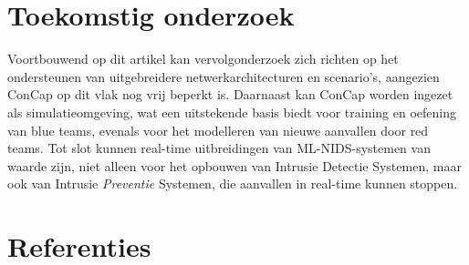 \documentclass[conference]{IEEEtran}
\begin{document}
	\section{Toekomstig onderzoek}
	Voortbouwend op dit artikel kan vervolgonderzoek zich richten op het ondersteunen van uitgebreidere netwerkarchitecturen en scenario’s, aangezien ConCap op dit vlak nog vrij beperkt is. Daarnaast kan ConCap worden ingezet als simulatieomgeving, wat een uitstekende basis biedt voor training en oefening van blue teams, evenals voor het modelleren van nieuwe aanvallen door red teams. Tot slot kunnen real-time uitbreidingen van ML-NIDS-systemen van waarde zijn, niet alleen voor het opbouwen van Intrusie Detectie Systemen, maar ook van Intrusie \textit{Preventie} Systemen, die aanvallen in real-time kunnen stoppen.
	
	
	\section*{Referenties}
	\printbibliography[heading=none]
\end{document}
